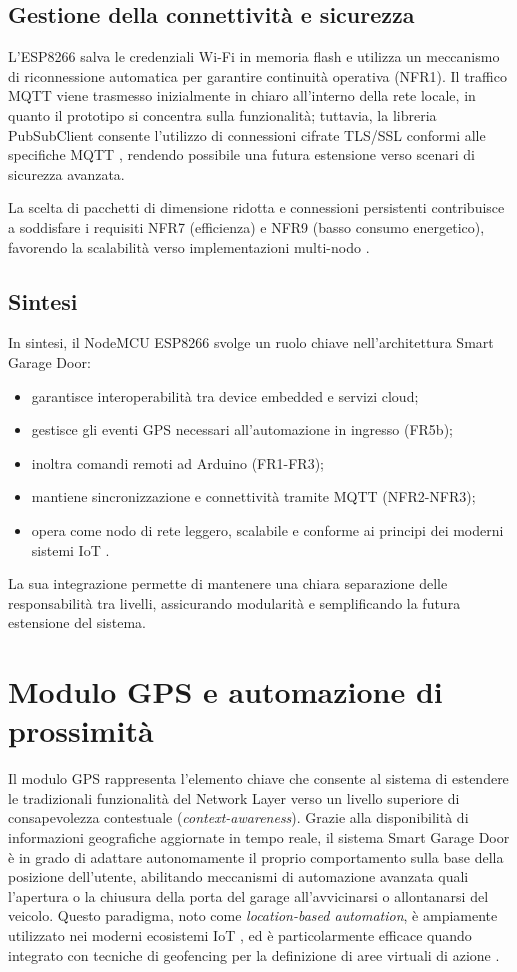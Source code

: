\subsection*{Gestione della connettività e sicurezza}
L'ESP8266 salva le credenziali Wi-Fi in memoria flash e utilizza un meccanismo di riconnessione automatica per garantire continuità operativa (NFR1). Il traffico MQTT viene trasmesso inizialmente in chiaro all'interno della rete locale, in quanto il prototipo si concentra sulla funzionalità; tuttavia, la libreria PubSubClient consente l'utilizzo di connessioni cifrate TLS/SSL conformi alle specifiche MQTT \cite{MQTT5}, rendendo possibile una futura estensione verso scenari di sicurezza avanzata.

La scelta di pacchetti di dimensione ridotta e connessioni persistenti contribuisce a soddisfare i requisiti NFR7 (efficienza) e NFR9 (basso consumo energetico), favorendo la scalabilità verso implementazioni multi-nodo \cite{Zanella2014}.

\subsection*{Sintesi}
In sintesi, il NodeMCU ESP8266 svolge un ruolo chiave nell'architettura Smart Garage Door:
\begin{itemize}
    \item garantisce interoperabilità tra device embedded e servizi cloud;
    \item gestisce gli eventi GPS necessari all'automazione in ingresso (FR5b);
    \item inoltra comandi remoti ad Arduino (FR1-FR3);
    \item mantiene sincronizzazione e connettività tramite MQTT (NFR2-NFR3);
    \item opera come nodo di rete leggero, scalabile e conforme ai principi dei moderni sistemi IoT \cite{Tang2022}.
\end{itemize}
La sua integrazione permette di mantenere una chiara separazione delle responsabilità tra livelli, assicurando modularità e semplificando la futura estensione del sistema.


\section{Modulo GPS e automazione di prossimità}
Il modulo GPS rappresenta l'elemento chiave che consente al sistema di estendere le tradizionali funzionalità del Network Layer verso un livello superiore di consapevolezza contestuale (\textit{context-awareness}). Grazie alla disponibilità di informazioni geografiche aggiornate in tempo reale, il sistema Smart Garage Door è in grado di adattare autonomamente il proprio comportamento sulla base della posizione dell'utente, abilitando meccanismi di automazione avanzata quali l'apertura o la chiusura della porta del garage all'avvicinarsi o allontanarsi del veicolo.
Questo paradigma, noto come \textit{location-based automation}, è ampiamente utilizzato nei moderni ecosistemi IoT \cite{Zanella2014}, ed è particolarmente efficace quando integrato con tecniche di geofencing per la definizione di aree virtuali di azione \cite{Perera2015}.

